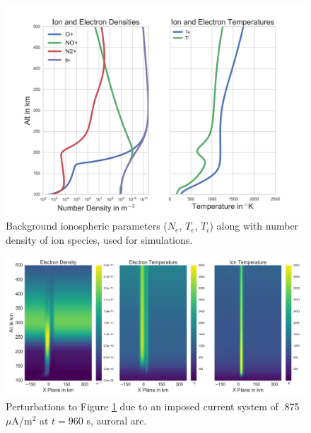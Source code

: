 \documentclass[draft,ras]{agutex}
\begin{document}
\begin{article}
\begin{figure}[!t]
\centering
\includegraphics[width=6in]{backgroundallparams}
\caption{Background ionospheric parameters ($N_e$, $T_e$, $T_i$) along with number density of ion species, used for simulations.}
\label{fig:plparamst0}
\end{figure}

\begin{figure}[!t]
\centering
\includegraphics[width=6in]{0960_15_int}
\caption{Perturbations to Figure \ref{fig:plparamst0} due to an imposed current system of .875 $\mu$A/m$^2$ at $t=960$ s, auroral arc.}
\label{fig:plparamst60}
\end{figure}


\end{article}
\end{document}
